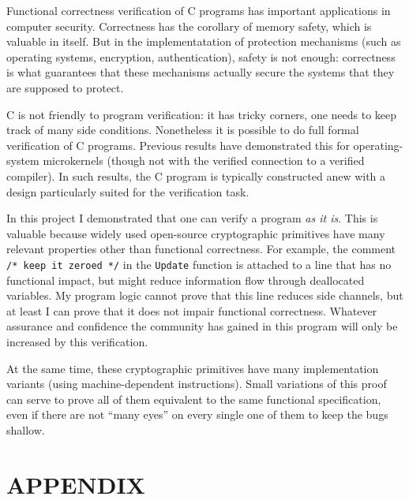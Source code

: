 \documentclass[prodmode,acmtoplas]{acmsmall}
\begin{document}
Functional correctness verification of C programs has important
applications in computer security.
Correctness  has the corollary
of memory safety, which is valuable in itself.
But in the implementatation of protection mechanisms (such as 
operating systems, encryption, authentication), safety is not
enough: correctness is what guarantees that these mechanisms
actually secure the systems that they are supposed to protect.

C is not friendly
to program verification:  it has tricky corners,
one needs to keep track of many side conditions.
Nonetheless it is possible to do full formal verification
of C programs.  Previous results have demonstrated this
for operating-system microkernels \cite{klein2009sel4} (though not with
the verified connection to a verified compiler).
In such results, the C program is typically constructed anew
with a design particularly suited for the verification task.

In this project I demonstrated that one can verify a program \emph{as it is}.
This is valuable because widely used open-source cryptographic primitives
have many relevant properties other than functional correctness.
For example, the comment \verb|/* keep it zeroed */|
in the \lstinline{Update} function is attached to a line
that has no functional impact, but might reduce information
flow through deallocated variables.  My program logic
cannot prove that this line reduces side channels,
but at least I can prove that it
does not impair functional correctness.
Whatever assurance and confidence the community has gained
in this program will only be increased by this verification.

At the same time, these cryptographic primitives have many 
implementation variants (using machine-dependent instructions).  
Small variations of this proof
can serve to prove all of them equivalent to the same
functional specification, even if there are not ``many eyes''
on every single one of them to keep the bugs shallow.






\clearpage
\appendix
\section*{APPENDIX}
\end{document}
